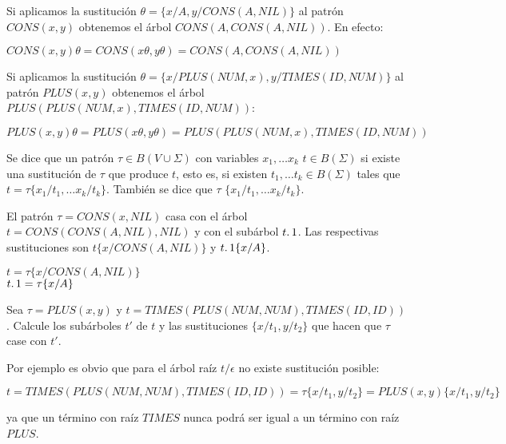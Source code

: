 \begin{example}
Si aplicamos la sustitución  $\theta = \{x/A, y/CONS(A, NIL)\}$
al patrón $CONS(x, y)$ obtenemos el árbol $CONS(A, CONS(A, NIL))$.
En efecto:

\begin{center}
$CONS(x, y)\theta = CONS(x\theta, y\theta) = CONS(A, CONS(A, NIL))$
\end{center}

\end{example}

\begin{example}
Si aplicamos la sustitución  $\theta = \{x/PLUS(NUM, x), y/TIMES(ID, NUM)\}$
al patrón $PLUS(x, y)$ obtenemos el árbol $PLUS(PLUS(NUM,x), TIMES(ID, NUM))$:

\begin{center}
$PLUS(x, y)\theta = PLUS(x\theta, y\theta) = PLUS(PLUS(NUM,x), TIMES(ID, NUM))$
\end{center}

\end{example}

\begin{definition}
Se dice que un patrón $\tau \in B(V \cup \Sigma)$ con variables
$x_1, \ldots x_k$ 
$t \in B(\Sigma)$ si existe una sustitución de $\tau$ que produce $t$, esto
es, si existen $t_1, \ldots t_k \in B(\Sigma)$ tales que 
$t = \tau \{x_1/t_1, \ldots x_k/t_k\}$. 
También se dice que $\tau$ 
$\{x_1/t_1, \ldots x_k/t_k\}$.
\end{definition}

\begin{example}
El patrón $\tau = CONS(x, NIL)$ casa con el árbol $t = CONS(CONS(A,NIL),NIL)$ 
y con el subárbol  $t \ldotp 1$. Las respectivas sustituciones son $t\{x/CONS(A,NIL)\}$ y 
$t \ldotp 1 \{x/A\}$.

\begin{center}
$t = \tau \{x/CONS(A,NIL)\}$\\
$t \ldotp 1 = \tau \{x/A\}$
\end{center}

\end{example}

\begin{exercise}
Sea $\tau = PLUS(x, y)$ y $t = TIMES(PLUS(NUM, NUM), TIMES(ID, ID))$.
Calcule los subárboles $t'$ de $t$ y las sustituciones $\{x/t_1, y/t_2\}$ 
que hacen que $\tau$ case con $t'$.  

Por ejemplo es obvio que para el árbol raíz $t/\epsilon$ no existe sustitución
posible:

$t = TIMES(PLUS(NUM, NUM), TIMES(ID, ID)) = \tau\{x/t_1, y/t_2\} =
PLUS(x, y)\{x/t_1, y/t_2\}$

ya que un término con raíz $TIMES$ nunca podrá ser igual a un término con raíz 
$PLUS$.
\end{exercise}


